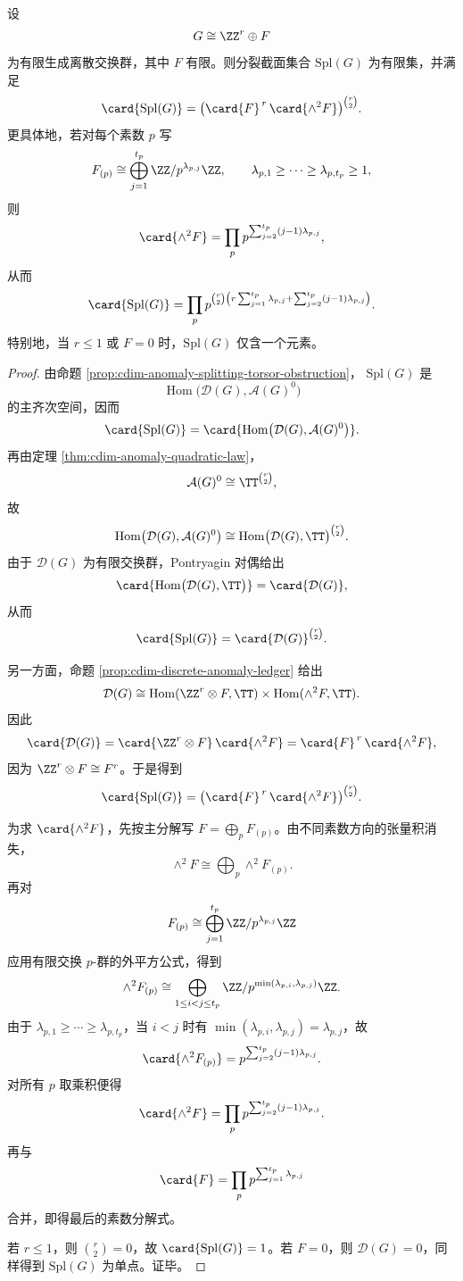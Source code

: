 \begin{theorem}\label{thm:xi-time-part78-anomaly-splitting-torsor-cardinality}
设
\[
G\cong \ZZ^r\oplus F
\]
为有限生成离散交换群，其中 \(F\) 有限。则分裂截面集合 \(\mathrm{Spl}(G)\) 为有限集，并满足
\[
\card{\mathrm{Spl}(G)}
=\bigl(\card{F}^{\,r}\,\card{\wedge^2 F}\bigr)^{\binom r2}.
\]
更具体地，若对每个素数 \(p\) 写
\[
F_{(p)}\cong \bigoplus_{j=1}^{t_p}\ZZ/p^{\lambda_{p,j}}\ZZ,
\qquad
\lambda_{p,1}\ge \cdots\ge \lambda_{p,t_p}\ge 1,
\]
则
\[
\card{\wedge^2 F}
=\prod_p p^{\sum_{j=2}^{t_p}(j-1)\lambda_{p,j}},
\]
从而
\[
\card{\mathrm{Spl}(G)}
=\prod_p
p^{\binom r2\left(
r\sum_{j=1}^{t_p}\lambda_{p,j}
+\sum_{j=2}^{t_p}(j-1)\lambda_{p,j}
\right)}.
\]
特别地，当 \(r\le 1\) 或 \(F=0\) 时，\(\mathrm{Spl}(G)\) 仅含一个元素。
\end{theorem}
\begin{proof}
由命题 \ref{prop:cdim-anomaly-splitting-torsor-obstruction}，
\(\mathrm{Spl}(G)\) 是
\[
\operatorname{Hom}\bigl(\mathcal D(G),\mathcal A(G)^0\bigr)
\]
的主齐次空间，因而
\[
\card{\mathrm{Spl}(G)}
=\card{\operatorname{Hom}\bigl(\mathcal D(G),\mathcal A(G)^0\bigr)}.
\]
再由定理 \ref{thm:cdim-anomaly-quadratic-law}，
\[
\mathcal A(G)^0\cong \TT^{\binom r2},
\]
故
\[
\operatorname{Hom}\bigl(\mathcal D(G),\mathcal A(G)^0\bigr)
\cong
\operatorname{Hom}\bigl(\mathcal D(G),\TT\bigr)^{\binom r2}.
\]
由于 \(\mathcal D(G)\) 为有限交换群，Pontryagin 对偶给出
\[
\card{\operatorname{Hom}\bigl(\mathcal D(G),\TT\bigr)}=\card{\mathcal D(G)},
\]
从而
\[
\card{\mathrm{Spl}(G)}=\card{\mathcal D(G)}^{\binom r2}.
\]

另一方面，命题 \ref{prop:cdim-discrete-anomaly-ledger} 给出
\[
\mathcal D(G)\cong
\operatorname{Hom}(\ZZ^r\otimes F,\TT)\times \operatorname{Hom}(\wedge^2F,\TT).
\]
因此
\[
\card{\mathcal D(G)}
=\card{\ZZ^r\otimes F}\,\card{\wedge^2F}
=\card{F}^{\,r}\,\card{\wedge^2F},
\]
因为 \(\ZZ^r\otimes F\cong F^r\)。于是得到
\[
\card{\mathrm{Spl}(G)}
=\bigl(\card{F}^{\,r}\,\card{\wedge^2F}\bigr)^{\binom r2}.
\]

为求 \(\card{\wedge^2F}\)，先按主分解写 \(F=\bigoplus_p F_{(p)}\)。由不同素数方向的张量积消失，
\[
\wedge^2F\cong \bigoplus_p \wedge^2F_{(p)}.
\]
再对
\[
F_{(p)}\cong \bigoplus_{j=1}^{t_p}\ZZ/p^{\lambda_{p,j}}\ZZ
\]
应用有限交换 \(p\)-群的外平方公式，得到
\[
\wedge^2F_{(p)}
\cong
\bigoplus_{1\le i<j\le t_p}\ZZ/p^{\min(\lambda_{p,i},\lambda_{p,j})}\ZZ.
\]
由于 \(\lambda_{p,1}\ge\cdots\ge\lambda_{p,t_p}\)，当 \(i<j\) 时有
\(\min(\lambda_{p,i},\lambda_{p,j})=\lambda_{p,j}\)，故
\[
\card{\wedge^2F_{(p)}}
=p^{\sum_{j=2}^{t_p}(j-1)\lambda_{p,j}}.
\]
对所有 \(p\) 取乘积便得
\[
\card{\wedge^2F}
=\prod_p p^{\sum_{j=2}^{t_p}(j-1)\lambda_{p,j}}.
\]
再与
\[
\card{F}=\prod_p p^{\sum_{j=1}^{t_p}\lambda_{p,j}}
\]
合并，即得最后的素数分解式。

若 \(r\le 1\)，则 \(\binom r2=0\)，故 \(\card{\mathrm{Spl}(G)}=1\)。若 \(F=0\)，则 \(\mathcal D(G)=0\)，同样得到 \(\mathrm{Spl}(G)\) 为单点。证毕。
\end{proof}

